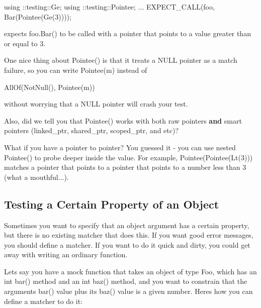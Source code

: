 \begin{DoxyCode}
using ::testing::Ge;
using ::testing::Pointee;
...
  EXPECT\_CALL(foo, Bar(Pointee(Ge(3))));
\end{DoxyCode}


expects {\ttfamily foo.\+Bar()} to be called with a pointer that points to a value greater than or equal to 3.

One nice thing about {\ttfamily Pointee()} is that it treats a {\ttfamily N\+U\+LL} pointer as a match failure, so you can write {\ttfamily Pointee(m)} instead of


\begin{DoxyCode}
AllOf(NotNull(), Pointee(m))
\end{DoxyCode}


without worrying that a {\ttfamily N\+U\+LL} pointer will crash your test.

Also, did we tell you that {\ttfamily Pointee()} works with both raw pointers {\bfseries and} smart pointers ({\ttfamily linked\+\_\+ptr}, {\ttfamily shared\+\_\+ptr}, {\ttfamily scoped\+\_\+ptr}, and etc)?

What if you have a pointer to pointer? You guessed it -\/ you can use nested {\ttfamily Pointee()} to probe deeper inside the value. For example, {\ttfamily Pointee(Pointee(\+Lt(3)))} matches a pointer that points to a pointer that points to a number less than 3 (what a mouthful...).

\subsection*{Testing a Certain Property of an Object}

Sometimes you want to specify that an object argument has a certain property, but there is no existing matcher that does this. If you want good error messages, you should define a matcher. If you want to do it quick and dirty, you could get away with writing an ordinary function.

Let\textquotesingle{}s say you have a mock function that takes an object of type {\ttfamily Foo}, which has an {\ttfamily int bar()} method and an {\ttfamily int baz()} method, and you want to constrain that the argument\textquotesingle{}s {\ttfamily bar()} value plus its {\ttfamily baz()} value is a given number. Here\textquotesingle{}s how you can define a matcher to do it\+:


